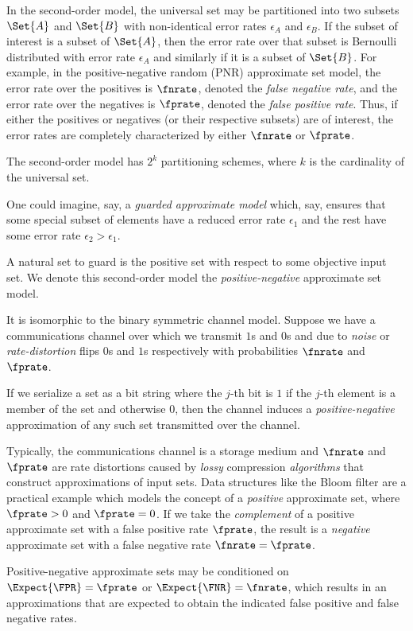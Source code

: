 \documentclass[ ../main.tex]{subfiles}
\begin{document}
In the second-order model, the universal set may be partitioned into two subsets $\Set{A}$ and $\Set{B}$ with non-identical error rates $\epsilon_A$ and $\epsilon_B$.
If the subset of interest is a subset of $\Set{A}$, then the error rate over that subset is Bernoulli distributed with error rate $\epsilon_A$ and similarly if it is a subset of $\Set{B}$.
For example, in the positive-negative random (PNR) approximate set model, the error rate over the positives is $\fnrate$, denoted the \emph{false negative rate}, and the error rate over the negatives is $\fprate$, denoted the \emph{false positive rate}.
Thus, if either the positives or negatives (or their respective subsets) are of interest, the error rates are completely characterized by either $\fnrate$ or $\fprate$.




The second-order model has $2^k$ partitioning schemes, where $k$ is the cardinality of the universal set.

One could imagine, say, a \emph{guarded approximate model} which, say, ensures that some special subset of elements have a reduced error rate $\epsilon_1$ and the rest have some error rate $\epsilon_2 > \epsilon_1$.

A natural set to guard is the positive set with respect to some objective input set.
We denote this second-order model the \emph{positive-negative} approximate set model.

It is isomorphic to the binary symmetric channel model.
Suppose we have a communications channel over which we transmit $1$s and $0$s and due to \emph{noise} or \emph{rate-distortion} flips $0$s and $1$s respectively with probabilities $\fnrate$ and $\fprate$.

If we serialize a set as a bit string where the $j$-th bit is $1$ if the $j$-th element is a member of the set and otherwise $0$, then the channel induces a \emph{positive-negative} approximation of any such set transmitted over the channel.

Typically, the communications channel is a storage medium and $\fnrate$ and $\fprate$ are rate distortions caused by \emph{lossy} compression \emph{algorithms} that construct approximations of input sets.
Data structures like the Bloom filter are a practical example which models the concept of a \emph{positive} approximate set, where $\fprate > 0$ and $\fprate = 0$.
If we take the \emph{complement} of a positive approximate set with a false positive rate $\fprate$, the result is a \emph{negative} approximate set with a false negative rate $\fnrate = \fprate$.

Positive-negative approximate sets may be conditioned on $\Expect{\FPR} = \fprate$ or $\Expect{\FNR} = \fnrate$, which results in an approximations that are expected to obtain the indicated false positive and false negative rates.
\end{document}
